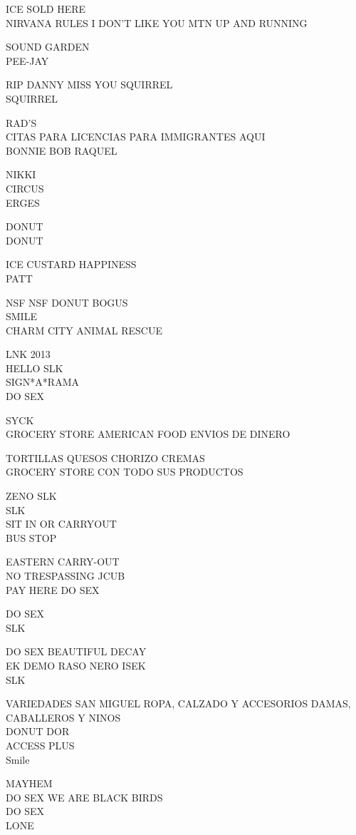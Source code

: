\documentclass[10pt,letterpaper]{article}
\begin{document}
ICE SOLD HERE\\
NIRVANA RULES I DON'T LIKE YOU MTN UP AND RUNNING

SOUND GARDEN\\
PEE{-}JAY

RIP DANNY MISS YOU SQUIRREL\\
SQUIRREL

RAD'S\\
CITAS PARA LICENCIAS PARA IMMIGRANTES AQUI\\
BONNIE BOB RAQUEL

NIKKI\\
CIRCUS\\
ERGES

DONUT\\
DONUT

ICE CUSTARD HAPPINESS\\
PATT

NSF NSF DONUT BOGUS\\
SMILE\\
CHARM CITY ANIMAL RESCUE

LNK 2013\\
HELLO SLK\\
SIGN*A*RAMA\\
DO SEX

SYCK\\
GROCERY STORE AMERICAN FOOD ENVIOS DE DINERO

TORTILLAS QUESOS CHORIZO CREMAS\\
GROCERY STORE CON TODO SUS PRODUCTOS

ZENO SLK\\
SLK\\
SIT IN OR CARRYOUT\\
BUS STOP

EASTERN CARRY{-}OUT\\
NO TRESPASSING JCUB\\
PAY HERE DO SEX

DO SEX\\
SLK

DO SEX BEAUTIFUL DECAY\\
EK DEMO RASO NERO ISEK\\
SLK

VARIEDADES SAN MIGUEL ROPA, CALZADO Y ACCESORIOS DAMAS, CABALLEROS Y NINOS\\
DONUT DOR\\
ACCESS PLUS\\
Smile

MAYHEM\\
DO SEX WE ARE BLACK BIRDS\\
DO SEX\\
LONE
\end{document}
